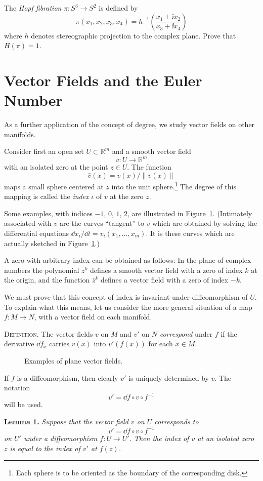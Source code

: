 The \emph{Hopf fibration} $\pi : S^3 \to S^2$ is defined by
\[
\pi(x_1, x_2, x_3, x_4) = h^{-1}\!\left(\frac{x_1 + \ii x_2}{x_3 + \ii x_4}\right)
\]
where $h$ denotes stereographic projection to the complex plane. Prove that $H(\pi) = 1$.



\section{Vector Fields and the Euler Number}

As a further application of the concept of degree, we study vector fields on other manifolds.

Consider first an open set $U \subset \mathbb{R}^m$ and a smooth vector field
\[
v : U \to \mathbb{R}^m
\]
with an isolated zero at the point $z \in U$. The function
\[
\bar{v}(x) = v(x) / \|v(x)\|
\]
maps a small sphere centered at $z$ into the unit sphere.\footnote{Each sphere is to be oriented as the boundary of the corresponding disk.} The degree of this mapping is called the \emph{index} $\iota$ of $v$ at the zero $z$.

Some examples, with indices $-1$, $0$, $1$, $2$, are illustrated in Figure~\ref{fig:milnor-12}. (Intimately associated with $v$ are the curves ``tangent'' to $v$ which are obtained by solving the differential equations $\dd x_i/\dd t = v_i(x_1, \ldots, x_m)$. It is these curves which are actually sketched in Figure~\ref{fig:milnor-12}.)

A zero with arbitrary index can be obtained as follows: In the plane of complex numbers the polynomial $z^k$ defines a smooth vector field with a zero of index $k$ at the origin, and the function $\bar{z}^k$ defines a vector field with a zero of index $-k$.

We must prove that this concept of index is invariant under diffeomorphism of $U$. To explain what this means, let us consider the more general situation of a map $f : M \to N$, with a vector field on each manifold.

\textsc{Definition.} The vector fields $v$ on $M$ and $v'$ on $N$ \emph{correspond} under $f$ if the derivative $\dd f_x$ carries $v(x)$ into $v'(f(x))$ for each $x \in M$.



\begin{figure}[htbp]
\centering
\setcounter{figure}{11}%
\caption{Examples of plane vector fields.}\label{fig:milnor-12}
\end{figure}

If $f$ is a diffeomorphism, then clearly $v'$ is uniquely determined by $v$. The notation
\[
v' = \dd f \circ v \circ f^{-1}
\]
will be used.

\noindent\textbf{Lemma 1.} \textit{Suppose that the vector field $v$ on $U$ corresponds to}
\[
v' = \dd f \circ v \circ f^{-1}
\]
\textit{on $U'$ under a diffeomorphism $f : U \to U'$. Then the index of $v$ at an isolated zero $z$ is equal to the index of $v'$ at $f(z)$.}

